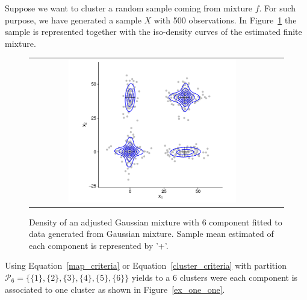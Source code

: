 \documentclass[10pt, a4paper]{article}
\begin{document}
\begin{spacing}{1.9}
Suppose we want to cluster a random sample coming from mixture $f$. For such purpose, we have generated a sample $X$ with 500 observations. In  Figure~\ref{ex_mixture} the sample is represented together with the iso-density curves of the estimated finite mixture.

\begin{figure}[thbp]
\begin{center}
\begin{tabular}{cc}
  \includegraphics[width=0.7\textwidth]{figures/partition-example-mixture.pdf} \\
 \end{tabular}
 \caption{Density of an adjusted Gaussian mixture with 6 component fitted to data generated from Gaussian mixture. Sample mean estimated of each component is represented by '+'.}\label{ex_mixture}
\end{center}
\end{figure}

Using Equation~\ref{map_criteria} or Equation~\ref{cluster_criteria} with partition $\mathcal{P}_6 = \{ \{1\},\{2\}, \{3\}, \{4\}, \{5\}, \{6\} \}$ yields to a 6 clusters were each component is associated to one cluster as shown in Figure~\ref{ex_one_one}.


\end{spacing}
\end{document}
